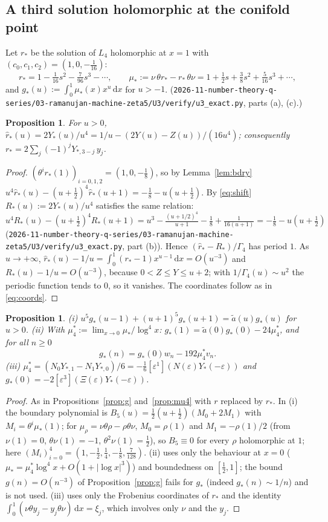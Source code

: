 \documentclass[11pt]{amsart}
\newtheorem{proposition}[theorem]{Proposition}
\theoremstyle{definition}
\theoremstyle{remark}
\numberwithin{equation}{section}
\newcommand{\dd}{\,\mathrm{d}}
\newcommand{\at}{\tilde a}
\newcommand{\file}[1]{\nolinkurl{2026-11-number-theory-q-series/03-ramanujan-machine-zeta5/#1}}
\begin{document}
\subsection{A third solution holomorphic at the conifold point}
Let $r_*$ be the solution of $L_4$ holomorphic at $x=1$ with $(c_0,c_1,c_2)=(1,0,-\frac1{16})$:
\[
r_*=1-\tfrac1{16}s^2-\tfrac7{96}s^3-\cdots,\qquad\mu_*:=\nu\,\theta r_*-r_*\,\theta\nu=1+\tfrac12s+\tfrac38s^2+\tfrac5{16}s^3+\cdots,
\]
and $g_*(u):=\int_0^1\mu_*(x)x^u\dd x$ for $u>-1$.
(\file{U3/verify/u3_exact.py}, parts (a), (c).)

\begin{proposition}\label{prop:rstar}
For $u>0$, $\hat r_*(u)=2Y_*(u)/u^4=1/u-(2Y(u)-Z(u))/(16u^4)$; consequently $r_*=2\sum_j(-1)^jY_{*,3-j}\,y_j$.
\end{proposition}
\begin{proof}
$(\theta^ir_*(1))_{i=0,1,2}=(1,0,-\frac18)$, so by Lemma~\ref{lem:bdry} $u^4\hat r_*(u)-(u+\frac12)^4\hat r_*(u+1)=-\frac18-u(u+\frac12)$. By \eqref{eq:shift} $R_*(u):=2Y_*(u)/u^4$ satisfies the same relation: $u^4R_*(u)-(u+\frac12)^4R_*(u+1)=u^3-\frac{(u+1/2)^4}{u+1}-\frac18+\frac1{16(u+1)}=-\frac18-u(u+\frac12)$ (\file{U3/verify/u3_exact.py}, part (b)). Hence $(\hat r_*-R_*)/\Gamma_4$ has period $1$. As $u\to+\infty$, $\hat r_*(u)-1/u=\int_0^1(r_*-1)x^{u-1}\dd x=O(u^{-3})$ and $R_*(u)-1/u=O(u^{-3})$, because $0<Z\le Y\le u+2$; with $1/\Gamma_4(u)\sim u^2$ the periodic function tends to $0$, so it vanishes. The coordinates follow as in \eqref{eq:coords}.
\end{proof}

\begin{proposition}\label{prop:gstar}
\textup{(i)} $u^5g_*(u-1)+(u+1)^5g_*(u+1)=\at(u)g_*(u)$ for $u>0$.
\textup{(ii)} With $\mu^*_4:=\lim_{x\to0}\mu_*/\log^4x$: $g_*(1)=\at(0)g_*(0)-24\mu_4^*$, and for all $n\ge0$
\begin{equation}\label{eq:gstar}
g_*(n)=g_*(0)w_n-192\mu_4^*v_n .
\end{equation}
\textup{(iii)} $\mu_4^*=(N_0Y_{*,1}-N_1Y_{*,0})/6=-\frac16[\varepsilon^1](N(\varepsilon)Y_*(-\varepsilon))$ and $g_*(0)=-2[\varepsilon^3](\Xi(\varepsilon)Y_*(-\varepsilon))$.
\end{proposition}
\begin{proof}
As in Propositions~\ref{prop:g} and~\ref{prop:mu4} with $r$ replaced by $r_*$. In (i) the boundary polynomial is $B_5(u)=\frac12(u+\frac12)(M_0+2M_1)$ with $M_i=\theta^i\mu_*(1)$; for $\mu_\rho=\nu\theta\rho-\rho\theta\nu$, $M_0=\rho(1)$ and $M_1=-\rho(1)/2$ (from $\nu(1)=0$, $\theta\nu(1)=-1$, $\theta^2\nu(1)=\frac12$), so $B_5\equiv0$ for every $\rho$ holomorphic at $1$; here $(M_i)_{i=0}^4=(1,-\frac12,\frac14,-\frac18,\frac7{128})$. (ii) uses only the behaviour at $x=0$ ($\mu_*=\mu_4^*\log^4x+O(1+|\log x|^3)$) and boundedness on $[\frac12,1]$; the bound $g(n)=O(n^{-3})$ of Proposition~\ref{prop:g} fails for $g_*$ (indeed $g_*(n)\sim1/n$) and is not used. (iii) uses only the Frobenius coordinates of $r_*$ and the identity $\int_0^1(\nu\theta y_j-y_j\theta\nu)\dd x=\xi_j$, which involves only $\nu$ and the $y_j$.
\end{proof}
\end{document}
